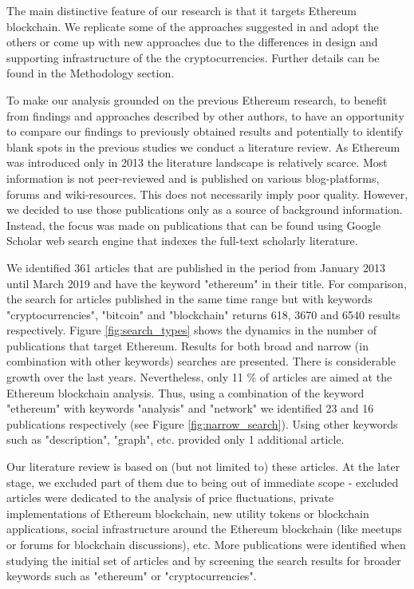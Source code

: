 The main distinctive feature of our research is that it targets Ethereum blockchain.
We replicate some of the approaches suggested in \cite{lischke2016analyzing} and adopt the others or come up with new approaches due to the differences in design and supporting infrastructure of the the cryptocurrencies.
Further details can be found in the Methodology section.

To make our analysis grounded on the previous Ethereum research, to benefit from findings and approaches described by other authors, to have an opportunity to compare our findings to previously obtained results and potentially to identify blank spots in the previous studies we conduct a literature review. 
As Ethereum was introduced only in 2013 the literature landscape is relatively scarce.
Most information is not peer-reviewed and is published on various blog-platforms, forums and wiki-resources.
This does not necessarily imply poor quality.
However, we decided to use those publications only as a source of background information.
Instead, the focus was made on publications that can be found using Google Scholar web search engine that indexes the full-text scholarly literature.

We identified 361 articles that are published in the period from January 2013 until March 2019 and have the keyword "ethereum" in their title. 
For comparison, the search for articles published in the same time range but with keywords "cryptocurrencies", "bitcoin" and "blockchain" returns 618, 3670 and 6540 results respectively.
Figure \ref{fig:search_types} shows the dynamics in the number of publications that target Ethereum. 
Results for both broad and narrow (in combination with other keywords) searches are presented.
There is considerable growth over the last years.
Nevertheless, only 11 \% of articles are aimed at the Ethereum blockchain analysis.
Thus, using a combination of the keyword "ethereum" with keywords "analysis" and "network" we identified 23 and 16 publications respectively (see Figure \ref{fig:narrow_search}).
Using other keywords such as "description", "graph", etc. provided only 1 additional article. 


Our literature review is based on (but not limited to) these articles.
At the later stage, we excluded part of them due to being out of immediate scope - excluded articles were dedicated to the analysis of price fluctuations, private implementations of Ethereum blockchain, new utility tokens or blockchain applications, social infrastructure around the Ethereum blockchain (like meetups or forums for blockchain discussions), etc.
More publications were identified when studying the initial set of articles and by screening the search results for broader keywords such as "ethereum" or "cryptocurrencies".

